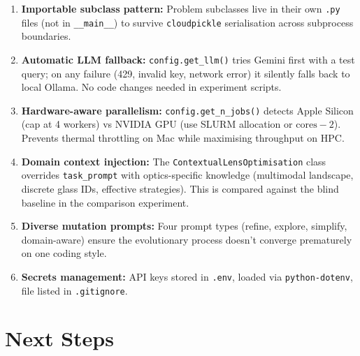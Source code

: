 \documentclass[a4paper,11pt]{article}
\begin{document}
\begin{enumerate}
    \item \textbf{Importable subclass pattern:} Problem subclasses live in
          their own \texttt{.py} files (not in \texttt{\_\_main\_\_}) to
          survive \texttt{cloudpickle} serialisation across subprocess
          boundaries.

    \item \textbf{Automatic LLM fallback:} \texttt{config.get\_llm()} tries
          Gemini first with a test query; on any failure (429, invalid key,
          network error) it silently falls back to local Ollama. No code
          changes needed in experiment scripts.

    \item \textbf{Hardware-aware parallelism:} \texttt{config.get\_n\_jobs()}
          detects Apple Silicon (cap at 4 workers) vs NVIDIA GPU (use SLURM
          allocation or $\text{cores} - 2$). Prevents thermal throttling on
          Mac while maximising throughput on HPC.

    \item \textbf{Domain context injection:} The
          \texttt{ContextualLensOptimisation} class overrides
          \texttt{task\_prompt} with optics-specific knowledge (multimodal
          landscape, discrete glass IDs, effective strategies). This is
          compared against the blind baseline in the comparison experiment.

    \item \textbf{Diverse mutation prompts:} Four prompt types (refine,
          explore, simplify, domain-aware) ensure the evolutionary process
          doesn't converge prematurely on one coding style.

    \item \textbf{Secrets management:} API keys stored in \texttt{.env},
          loaded via \texttt{python-dotenv}, file listed in
          \texttt{.gitignore}.
\end{enumerate}

\section{Next Steps}
\end{document}
